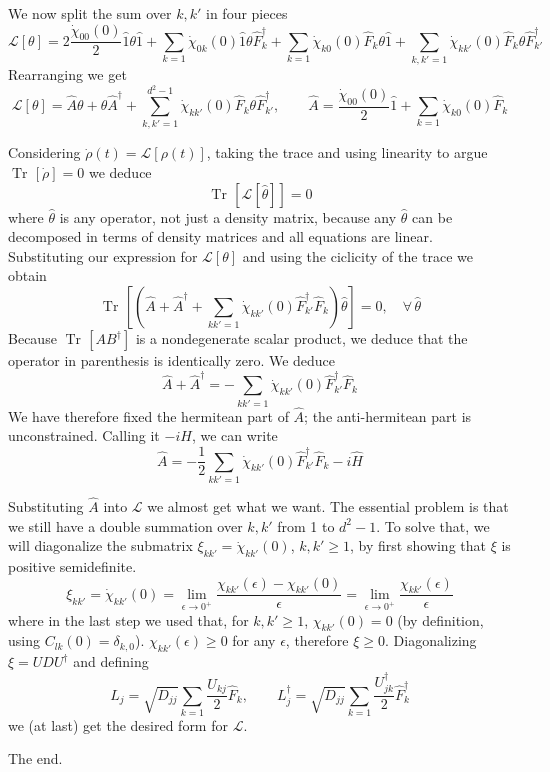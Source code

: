 \documentclass[a4paper, 11pt]{article}
\newcommand{\Tr}{\mathop{\mathrm{Tr}\!}{}}
\newcommand{\LL}{\mathcal{L}}
\begin{document}
	We now split the sum over $k,k'$ in four pieces
	\[ \LL[\theta] = 2 \dfrac{\dot{\chi}_{00}(0)}{2} \hat{1}\theta \hat{1} + \sum_{k=1} \dot{\chi}_{0k}(0) \hat{1} \theta \hat{F}_k^\dagger +
	\sum_{k=1} \dot{\chi}_{k0}(0) \hat{F}_k \theta \hat{1} + \sum_{k,k'=1} \dot{\chi}_{kk'}(0) \hat{F}_k \theta \hat{F}_{k'}^\dagger \]
	Rearranging we get
	\[ \LL[\theta] = \hat{A} \theta + \theta \hat{A}^\dagger + \sum_{k,k'=1}^{d^2-1} \dot{\chi}_{kk'}(0) \hat{F}_k \theta \hat{F}_{k'}^\dagger,\qquad	\hat{A} = \dfrac{\dot{\chi}_{00}(0)}{2} \hat{1} + \sum_{k=1} \dot{\chi}_{k0}(0) \hat{F}_k \]
	
	Considering $\dot{\rho}(t) = \LL[\rho(t)]$, taking the trace and using linearity to argue $\Tr[\dot{\rho}]=0$ we deduce
	\[ \Tr\left[ \LL[\hat{\theta}] \right] = 0 \]
	where $\hat{\theta}$ is any operator, not just a density matrix, because any $\hat{\theta}$ can be decomposed in terms of density matrices and all equations are linear. Substituting our expression for $\LL[\theta]$ and using the ciclicity of the trace we obtain
	\[ \Tr\left[ \left(\hat{A} + \hat{A}^\dagger + \sum_{kk'=1} \dot{\chi}_{kk'}(0) \hat{F}_{k'}^\dagger \hat{F}_k\right) \hat{\theta} \right] = 0,\quad \forall\, \hat{\theta} \]
	Because $\Tr[AB^\dagger]$ is a nondegenerate scalar product, we deduce that the operator in parenthesis is identically zero. We deduce
	\[ \hat{A} + \hat{A}^\dagger = - \sum_{kk'=1} \dot{\chi}_{kk'}(0) \hat{F}_{k'}^\dagger \hat{F}_k \]
	We have therefore fixed the hermitean part of $\hat{A}$; the anti-hermitean part is unconstrained. Calling it $-iH$, we can write
	\[ \hat{A} = -\frac{1}{2} \sum_{kk'=1} \dot{\chi}_{kk'}(0) \hat{F}_{k'}^\dagger \hat{F}_k - i\hat{H} \]
	
	Substituting $\hat{A}$ into $\LL$ we almost get what we want. The essential problem is that we still have a double summation over $k,k'$ from 1 to $d^2-1$. To solve that, we will diagonalize the submatrix $\xi_{kk'} = \dot{\chi}_{kk'}(0)$, $k,k'\ge 1$, by first showing that $\xi$ is positive semidefinite.
	\[ \xi_{kk'} = \dot{\chi}_{kk'}(0) = \lim_{\epsilon\rightarrow 0^+} \dfrac{\chi_{kk'}(\epsilon) -\chi_{kk'}(0)}{\epsilon} =
	\lim_{\epsilon\rightarrow 0^+} \dfrac{\chi_{kk'}(\epsilon)}{\epsilon} \]
	where in the last step we used that, for $k,k'\ge 1$, $\chi_{kk'}(0)=0$ (by definition, using $C_{lk}(0)=\delta_{k,0}$).
	$\chi_{kk'}(\epsilon)\ge 0$ for any $\epsilon$, therefore $\xi\ge 0$. Diagonalizing $\xi = UDU^\dagger$ and defining
	\[ L_j = \sqrt{D_{jj}} \sum_{k=1} \frac{U_{kj}}{2} \hat{F}_k,\qquad L_j^\dagger = \sqrt{D_{jj}} \sum_{k=1} \frac{U^\dagger_{jk}}{2} \hat{F}^\dagger_k \]
	we (at last) get the desired form for $\LL$.
	
	\newpage
	The end.
\end{document}

